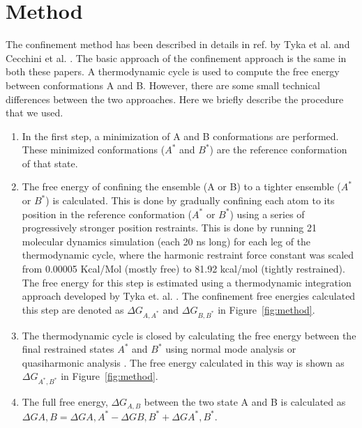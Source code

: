 \documentclass[12pt]{article}
\begin{document}
\section{Method}

The confinement method has been described in details in ref. by Tyka et al. \cite{Tyka2006} and
Cecchini et  al. \cite{Cecchini2009}. The basic approach of the confinement approach is the same in
both these papers. A thermodynamic cycle is used to compute the free energy between conformations A
and B. However, there are some small technical differences between the two approaches. Here we briefly
describe the procedure that we used.

\begin{enumerate}

\item  In the first step, a minimization of A and B conformations are performed. These minimized conformations
    ($A^{\ast}$ and $B^{\ast}$) are the reference conformation of that state.

\item The free energy of confining the ensemble (A or B) to a tighter ensemble ($A^\ast$ or $B^\ast$) is calculated.
    This is done by gradually confining each atom to its position in the reference conformation ($A^{\ast}$ or
    $B^{\ast}$) using a series of progressively stronger position restraints. This is done by running 21 molecular
    dynamics simulation (each 20 ns long) for each leg of the thermodynamic cycle, where the harmonic restraint force
    constant was scaled from 0.00005 Kcal/Mol (mostly free) to 81.92 kcal/mol (tightly restrained). The free energy for
    this step is estimated using a thermodynamic integration approach developed by Tyka et. al. \cite{Tyka2006}. The
    confinement free energies calculated this step are denoted as $\Delta G_{A,A^\ast}$ and $\Delta G_{B,B^\ast}$ in
    Figure~\ref{fig:method}. 

\item The thermodynamic cycle is closed by calculating the free energy between the final restrained states $A^\ast$ and
    $B^\ast$ using normal mode analysis \cite{Brooks1983,Case1994} or quasiharmonic analysis \cite{Karplus1981,Levy1984}. The free energy calculated in this way is shown as
    $\Delta G_{A^\ast,B^\ast}$ in Figure~\ref{fig:method}.

\item  The full free energy, $\Delta G_{A,B}$ between the two state A and B is calculated as
    $\Delta G{A,B} = \Delta G{A,A^\ast} - \Delta G{B,B^\ast} + \Delta G{A^\ast,B^\ast}$.

\end{enumerate}
\end{document}
